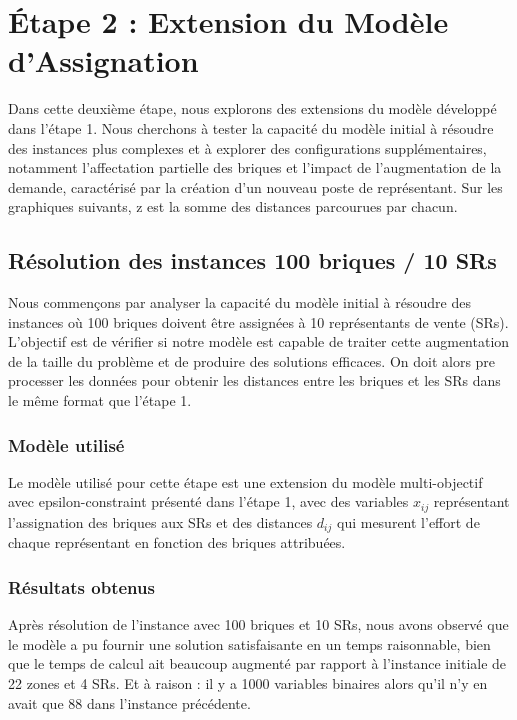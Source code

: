 \section{Étape 2 : Extension du Modèle d'Assignation}

Dans cette deuxième étape, nous explorons des extensions du modèle développé dans l'étape 1. Nous cherchons à tester la capacité du modèle initial à résoudre des instances plus complexes et à explorer des configurations supplémentaires, notamment l'affectation partielle des briques et l'impact de l'augmentation de la demande, caractérisé par la création d'un nouveau poste de représentant.
Sur les graphiques suivants, z est la somme des distances parcourues par chacun.

\subsection{Résolution des instances 100 briques / 10 SRs}
Nous commençons par analyser la capacité du modèle initial à résoudre des instances où 100 briques doivent être assignées à 10 représentants de vente (SRs). L'objectif est de vérifier si notre modèle est capable de traiter cette augmentation de la taille du problème et de produire des solutions efficaces. On doit alors pre processer les données pour obtenir les distances entre les briques et les SRs dans le même format que l'étape 1.

\subsubsection{Modèle utilisé}
Le modèle utilisé pour cette étape est une extension du modèle multi-objectif avec epsilon-constraint présenté dans l’étape 1, avec des variables $x_{ij}$ représentant l'assignation des briques aux SRs et des distances $d_{ij}$ qui mesurent l'effort de chaque représentant en fonction des briques attribuées.

\subsubsection{Résultats obtenus}
Après résolution de l'instance avec 100 briques et 10 SRs, nous avons observé que le modèle a pu fournir une solution satisfaisante en un temps raisonnable, bien que le temps de calcul ait beaucoup augmenté par rapport à l'instance initiale de 22 zones et 4 SRs.
Et à raison : il y a 1000 variables binaires alors qu'il n'y en avait que 88 dans l'instance précédente.


